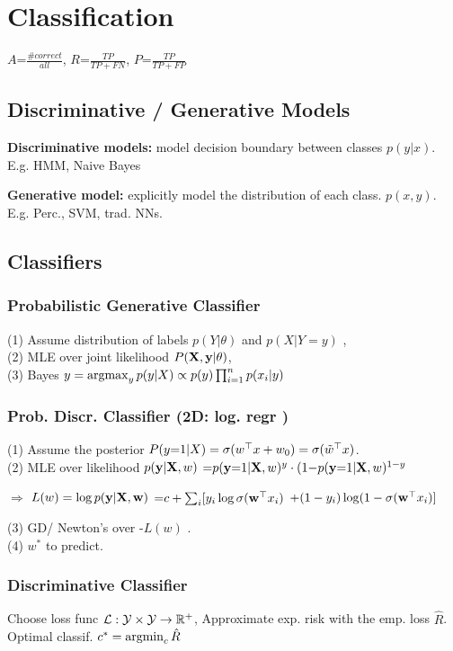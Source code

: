 \section{Classification}
$\textit{A=}\frac{\textit{\# correct}}{all}$, $\textit{R=}\frac{TP}{TP+FN}$, $\textit{P=}\frac{TP}{TP+FP}$
\subsection{Discriminative / Generative Models}
\textbf{Discriminative models:} model decision boundary between classes $p(y|x)$. E.g. HMM, Naive Bayes

\textbf{Generative model:} explicitly model the distribution of each class. $p(x,y)$. E.g. Perc., SVM, trad. NNs.

\subsection{Classifiers}
\subsubsection{Probabilistic Generative Classifier}
(1) Assume distribution of labels $p(Y|\theta)$ and $p(X|Y=y)$ , \\
(2) MLE over joint likelihood 
	$		
		P(\mathbf X, \mathbf y|\theta)
	$,\\
(3)  Bayes 
$		y = \mathop{\mathrm{argmax}}_y p(y|X) \propto p(y)\prod_{i=1}^n p(x_i|y)$

\subsubsection{Prob. Discr. Classifier (2D: log. regr
) }
(1) Assume the posterior $P(y{=}1|X) = \sigma({w}^\top x + w_0) = \sigma({\tilde w}^\top x)$. \\
(2) MLE over likelihood 
	$
		p(\mathbf y|\mathbf X, w)$ $ {=} p(\mathbf y {=} 1|\mathbf X,w)^y\cdot (1 {-} p(\mathbf y {=} 1|\mathbf X,w)^{1{-}y}
	$
	
	$\Rightarrow$
	$
		L(w) = \log p(\mathbf y|\mathbf X, \mathbf w) $ $
		 {=} c + \sum_i[y_i\log\sigma({\mathbf w}^\top x_i)$ $+ (1-y_i)\log(1-\sigma({\mathbf w}^\top x_i)]
	$
	
(3) GD/ Newton's over -$L(w)$ . \\
(4) $w^*$ to predict.

\subsubsection{Discriminative Classifier}
Choose loss func $\mathcal L : \mathcal Y \times \mathcal Y \to \mathbb R^+$, Approximate exp. risk with the emp. loss $\hat R$. Optimal classif. $c^* = \mathop{\mathrm{argmin}}_c \hat R$






